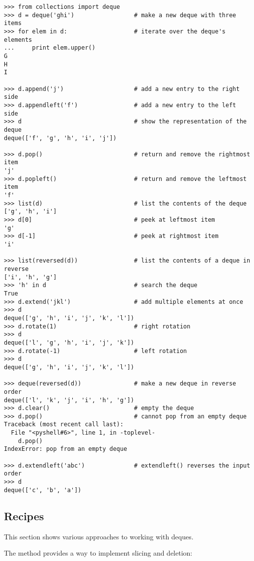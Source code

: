 \begin{verbatim}
>>> from collections import deque
>>> d = deque('ghi')                 # make a new deque with three items
>>> for elem in d:                   # iterate over the deque's elements
...     print elem.upper()	
G
H
I

>>> d.append('j')                    # add a new entry to the right side
>>> d.appendleft('f')                # add a new entry to the left side
>>> d                                # show the representation of the deque
deque(['f', 'g', 'h', 'i', 'j'])

>>> d.pop()                          # return and remove the rightmost item
'j'
>>> d.popleft()                      # return and remove the leftmost item
'f'
>>> list(d)                          # list the contents of the deque
['g', 'h', 'i']
>>> d[0]                             # peek at leftmost item
'g'
>>> d[-1]                            # peek at rightmost item
'i'

>>> list(reversed(d))                # list the contents of a deque in reverse
['i', 'h', 'g']
>>> 'h' in d                         # search the deque
True
>>> d.extend('jkl')                  # add multiple elements at once
>>> d
deque(['g', 'h', 'i', 'j', 'k', 'l'])
>>> d.rotate(1)                      # right rotation
>>> d
deque(['l', 'g', 'h', 'i', 'j', 'k'])
>>> d.rotate(-1)                     # left rotation
>>> d
deque(['g', 'h', 'i', 'j', 'k', 'l'])

>>> deque(reversed(d))               # make a new deque in reverse order
deque(['l', 'k', 'j', 'i', 'h', 'g'])
>>> d.clear()                        # empty the deque
>>> d.pop()                          # cannot pop from an empty deque
Traceback (most recent call last):
  File "<pyshell#6>", line 1, in -toplevel-
    d.pop()
IndexError: pop from an empty deque

>>> d.extendleft('abc')              # extendleft() reverses the input order
>>> d
deque(['c', 'b', 'a'])
\end{verbatim}

\subsection{Recipes \label{deque-recipes}}

This section shows various approaches to working with deques.

The  method provides a way to implement 
slicing and deletion:

